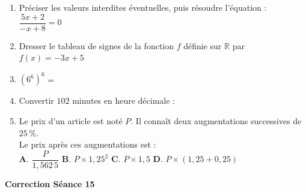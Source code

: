 \documentclass[a4paper,11pt]{article}
\begin{document}

\begin{seanceD}{} %

\begin{enumerate}
\item Préciser les valeurs interdites éventuelles, puis résoudre l'équation : $\dfrac{5x+2}{-x+8}=0$ \dotfill

\dotfill

\dotfill

\item Dresser le tableau de signes de la fonction $f$ définie sur $\mathbb R$ par $f(x)=-3x+5$

\vspace*{1.5cm}

\item $\left(6^{6}\right)^{6}$ = \dotfill

\item Convertir $102$ minutes en heure décimale : \dotfill

\item Le prix d'un article est noté $P$. Il connaît deux augmentations successives de $25\,\%$. \\
Le prix après ces augmentations est : \\ 
\textbf{A}. $\dfrac{P}{1{,}562\,5}$ \quad \textbf{B}. $P \times 1,25^2$ \quad \textbf{C}. $P \times 1{,}5$ \quad \textbf{D}. $P \times \left(1{,}25 + 0{,}25\right)$

\dotfill

\end{enumerate}

\end{seanceD}

\vspace{0.5cm}
\begin{center}

\textbf{\textcolor{Couleur8}{Correction Séance 15}}\\
\vspace{2mm}

\end{center}

\newpage

\end{document}

